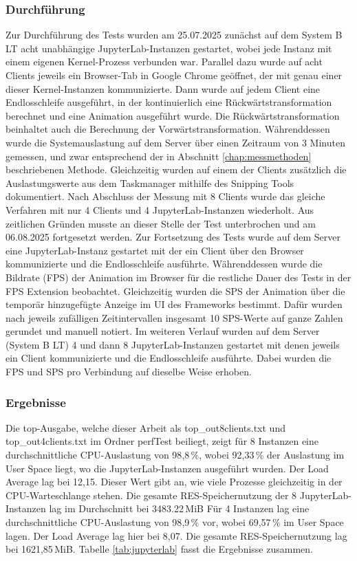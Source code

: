 \subsubsection{Durchführung}
Zur Durchführung des Tests wurden am 25.07.2025 zunächst auf dem System B LT acht unabhängige JupyterLab-Instanzen gestartet,
wobei jede Instanz mit einem eigenen Kernel-Prozess verbunden war.
Parallel dazu wurde auf acht Clients jeweils ein Browser-Tab in Google Chrome geöffnet, der mit genau einer dieser Kernel-Instanzen kommunizierte.
Dann wurde auf jedem Client eine Endlosschleife ausgeführt,
in der kontinuierlich eine Rückwärtstransformation berechnet und eine Animation ausgeführt wurde.
Die Rückwärtstransformation beinhaltet auch die Berechnung der Vor\-wärts\-trans\-for\-ma\-tion.
Währenddessen wurde die Systemauslastung auf dem Server über einen Zeitraum von 3 Minuten gemessen,
und zwar entsprechend der in Abschnitt \ref{chap:messmethoden} beschriebenen Methode.
Gleichzeitig wurden auf einem der Clients zusätzlich die Auslastungswerte aus dem Taskmanager mithilfe des Snipping Tools dokumentiert.
Nach Abschluss der Messung mit 8 Clients wurde das gleiche Verfahren mit nur 4 Clients und 4 JupyterLab-Instanzen wiederholt.
Aus zeitlichen Gründen musste an dieser Stelle der Test unterbrochen und am 06.08.2025 fortgesetzt werden.
Zur Fortsetzung des Tests wurde auf dem Server eine JupyterLab-Instanz gestartet mit der ein Client über den Browser kommunizierte und die Endlosschleife ausführte.
Währenddessen wurde die Bildrate (FPS) der Animation im Browser für die restliche Dauer des Tests in der FPS Extension beobachtet.
Gleichzeitig wurden die SPS der Animation über die temporär hinzugefügte Anzeige im UI des Frameworks bestimmt.
Dafür wurden nach jeweils zufälligen Zeitintervallen insgesamt 10 SPS-Werte auf ganze Zahlen gerundet und manuell notiert.
Im weiteren Verlauf wurden auf dem Server (System B LT) 4 und dann 8 JupyterLab-Instanzen gestartet mit denen jeweils ein Client kommunizierte und die Endlosschleife ausführte.
Dabei wurden die FPS und SPS pro Verbindung auf dieselbe Weise erhoben.




\subsubsection{Ergebnisse}
Die top-Ausgabe, welche dieser Arbeit als top\_out8clients.txt und top\_out4clients.txt im Ordner perfTest beiliegt,
zeigt für 8 Instanzen eine durchschnittliche CPU-Auslastung von 98{,}8\,\%, wobei 92{,}33\,\% der Auslastung im User Space liegt, wo die JupyterLab-Instanzen ausgeführt wurden.
Der Load Average lag bei 12{,}15.
Dieser Wert gibt an, wie viele Prozesse gleichzeitig in der CPU-Warteschlange stehen.
Die gesamte RES-Speichernutzung der 8 JupyterLab-Instanzen lag im Durchschnitt bei 3483.22\,MiB
Für 4 Instanzen lag eine durchschnittliche CPU-Auslastung von 98{,}9\,\% vor, wobei 69{,}57\,\% im User Space lagen.
Der Load Average lag hier bei 8{,}07.
Die gesamte RES-Speichernutzung lag bei 1621{,}85\,MiB.
Tabelle \ref{tab:jupyterlab} fasst die Ergebnisse zusammen.



